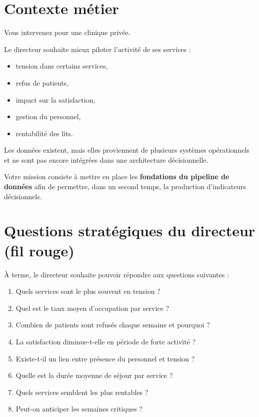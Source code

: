 \documentclass[11pt,a4paper]{article}
\begin{document}
\TPFrontPage


\section*{Contexte métier}

Vous intervenez pour une clinique privée.

Le directeur souhaite mieux piloter l’activité de ses services :
\begin{itemize}
  \item tension dans certains services,
  \item refus de patients,
  \item impact sur la satisfaction,
  \item gestion du personnel,
  \item rentabilité des lits.
\end{itemize}

Les données existent, mais elles proviennent de plusieurs systèmes opérationnels
et ne sont pas encore intégrées dans une architecture décisionnelle.

Votre mission consiste à mettre en place les \textbf{fondations du pipeline de données}
afin de permettre, dans un second temps, la production d’indicateurs décisionnels.

\bigskip

\section*{Questions stratégiques du directeur (fil rouge)}

À terme, le directeur souhaite pouvoir répondre aux questions suivantes :

\begin{enumerate}
  \item Quels services sont le plus souvent en tension ?
  \item Quel est le taux moyen d’occupation par service ?
  \item Combien de patients sont refusés chaque semaine et pourquoi ?
  \item La satisfaction diminue-t-elle en période de forte activité ?
  \item Existe-t-il un lien entre présence du personnel et tension ?
  \item Quelle est la durée moyenne de séjour par service ?
  \item Quels services semblent les plus rentables ?
  \item Peut-on anticiper les semaines critiques ?
\end{enumerate}
\end{document}
